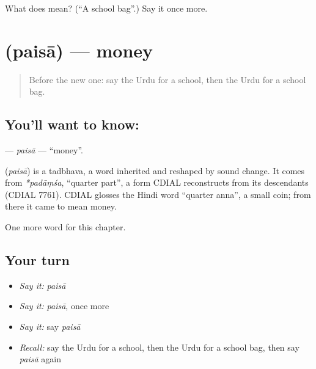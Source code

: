 \begin{tcolorbox}[breakable,colback=teal!4,colframe=teal!35!black,title={Before you move on}]
What does  mean? (\textquotedblleft{}A school bag\textquotedblright{}.) Say it once more.
\end{tcolorbox}
\section[\texorpdfstring{\ur{پیسہ} (paisā)}{پیسہ (paisā)}]{ (paisā) — money}

\label{lesson:UR-C62-paisa}



\begin{quote}
Before the new one: say the Urdu for a school, then the Urdu for a school bag.
\end{quote}

\subsection*{You'll want to know: }
\textbf{} — \emph{paisā} — \textquotedblleft{}money\textquotedblright{}.

\begin{cousinweb}
\textbf{} (\emph{paisā}) is a tadbhava, a word inherited and reshaped by sound change. It comes from \emph{*padāṃśa}, \textquotedblleft{}quarter part\textquotedblright{}, a form CDIAL reconstructs from its descendants (CDIAL 7761). CDIAL glosses the Hindi word \textquotedblleft{}quarter anna\textquotedblright{}, a small coin; from there it came to mean money.
\end{cousinweb}

\begin{grammarlens}[title={What you've built}]
One more word for this chapter.
\end{grammarlens}

\subsection*{Your turn}
\begin{itemize}
\raggedright
  \item \emph{Say it:} \emph{paisā}
  \item \emph{Say it:} \emph{paisā}, once more
  \item \emph{Say it:} say \emph{paisā}
  \item \emph{Recall:} say the Urdu for a school, then the Urdu for a school bag, then say \emph{paisā} again
\end{itemize}

